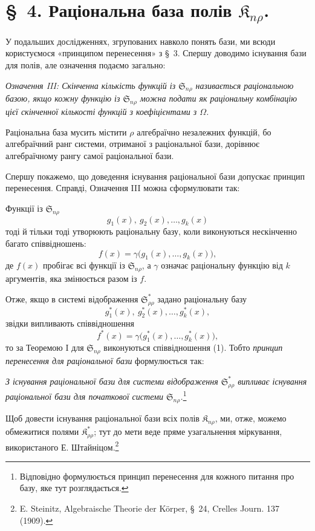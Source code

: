 \documentclass[11pt]{article}
\providecommand{\Kfield}{\mathfrak{K}}
\providecommand{\Ssys}{\mathfrak{S}}
\begin{document}
\section*{\S\ 4. Раціональна база полів $\Kfield_{n\rho}$.}

У подальших дослідженнях, згрупованих навколо понять бази, ми всюди користуємося «принципом перенесення» з \S\ 3. Спершу доводимо існування бази для полів, але означення подаємо загально:

\emph{Означення III: Скінченна кількість функцій із $\Ssys_{n\rho}$ називається раціональною базою, якщо кожну функцію із $\Ssys_{n\rho}$ можна подати як раціональну комбінацію цієї скінченної кількості функцій з коефіцієнтами з $\Omega$.}

Раціональна база мусить містити $\rho$ алгебраїчно незалежних функцій, бо алгебраїчний ранг системи, отриманої з раціональної бази, дорівнює алгебраїчному рангу самої раціональної бази.

Спершу покажемо, що доведення існування раціональної бази допускає принцип перенесення. Справді, Означення III можна сформулювати так:

Функції із $\Ssys_{n\rho}$
\[
  g_1(x),\ g_2(x),\ldots, g_k(x)
\]
тоді й тільки тоді утворюють раціональну базу, коли виконуються нескінченно багато співвідношень:
\begin{equation}
  f(x)=\gamma\bigl(g_1(x),\ldots,g_k(x)\bigr),
\tag{1}
\end{equation}
де $f(x)$ пробігає всі функції із $\Ssys_{n\rho}$, а $\gamma$ означає раціональну функцію від $k$ аргументів, яка змінюється разом із $f$.

Отже, якщо в системі відображення $\Ssys^*_{\rho\rho}$ задано раціональну базу
\[
  g_1^*(x),\ g_2^*(x),\ldots, g_k^*(x),
\]
звідки випливають співвідношення
\[
  f^*(x)=\gamma\bigl(g_1^*(x),\ldots,g_k^*(x)\bigr),
\]
то за Теоремою I для $\Ssys_{n\rho}$ виконуються співвідношення (1). Тобто \emph{принцип перенесення для раціональної бази} формулюється так:

\emph{З існування раціональної бази для системи відображення $\Ssys^*_{\rho\rho}$ випливає існування раціональної бази для початкової системи $\Ssys_{n\rho}$.}\footnote{Відповідно формулюється принцип перенесення для кожного питання про базу, яке тут розглядається.}

Щоб довести існування раціональної бази всіх полів $\Kfield_{n\rho}$, ми, отже, можемо обмежитися полями $\Kfield^*_{\rho\rho}$; тут до мети веде пряме узагальнення міркування, використаного Е. Штайніцом.\footnote{E. Steinitz, Algebraische Theorie der Körper, \S\ 24, Crelles Journ. 137 (1909).}
\end{document}
